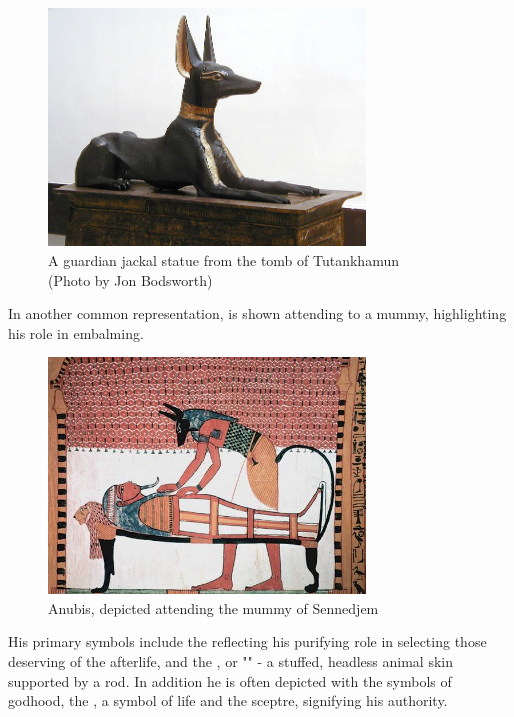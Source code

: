 \begin{figure} [H]
	\centering
	\includegraphics[width=0.75\textwidth]{../photos/Tutankhamun_Jackal}
	\caption{A guardian jackal statue from the tomb of Tutankhamun\\(Photo by Jon Bodsworth)}
\end{figure}

In another common representation,  is shown attending to a mummy, highlighting his role in embalming.

\begin{figure} [H]
	\centering
	\includegraphics[width=0.75\textwidth]{../photos/Anubis_Sennedjem}
	\caption{Anubis, depicted attending the mummy of Sennedjem}
\end{figure}

His primary symbols include the  reflecting his purifying role in selecting those deserving of the afterlife, and the , or "" - a stuffed, headless animal skin supported by a rod. In addition he is often depicted with the symbols of godhood, the , a symbol of life and the  sceptre, signifying his authority.

